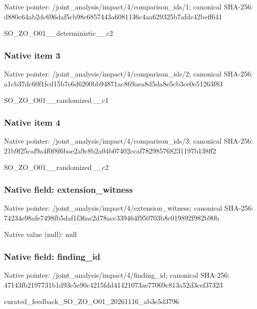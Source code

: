 \documentclass[10pt,a4paper]{article}
\begin{document}
Native pointer: /joint\_analysis/impact/4\allowbreak{}/comparison\_ids/1; canonical SHA-256: d880c64ab2dc696daf5cb98c\allowbreak{}6857443a6081136c4aa62932\allowbreak{}5b7afdc42beff641


SO\_ZO\_O01\_\_deterministic\_\_c2


\subsubsection{Native item 3}


Native pointer: /joint\_analysis/impact/4\allowbreak{}/comparison\_ids/2; canonical SHA-256: a1cb37dc60f1fcd15b7e6d62\allowbreak{}00bb94871ac869aea8d5da8e\allowbreak{}5cb3ce0e51263f83


SO\_ZO\_O01\_\_randomized\_\_c1


\subsubsection{Native item 4}


Native pointer: /joint\_analysis/impact/4\allowbreak{}/comparison\_ids/3; canonical SHA-256: 21b9f25caf9a4f0f8f6bae2a\allowbreak{}9c8b2a04b07402ccaf782985\allowbreak{}768231197b138ff2


SO\_ZO\_O01\_\_randomized\_\_c2


\subsubsection{Native field: extension\_witness}


Native pointer: /joint\_analysis/impact/4\allowbreak{}/extension\_witness; canonical SHA-256: 74234e98afe7498fb5daf1f3\allowbreak{}6ac2d78acc339464f950703b\allowbreak{}8c019892f982b90b



Native value (null): null



\subsubsection{Native field: finding\_id}


Native pointer: /joint\_analysis/impact/4/finding\_id; canonical SHA-256: 47143fb2197731b1d93c5e90\allowbreak{}c4215fdd41421073ae77069c\allowbreak{}813a52d3cef37323


curated\_feedback\_SO\_ZO\_O\allowbreak{}01\_20261116\_ab3e5d3796
\end{document}
